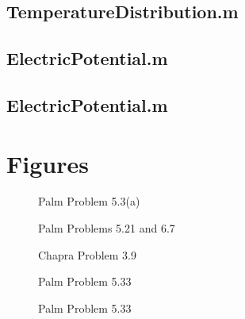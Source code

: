 \documentclass{article}
\begin{document}
\subsection{TemperatureDistribution.m}

\subsection{ElectricPotential.m}

\subsection{ElectricPotential.m}

\pagebreak


\section{Figures}

\begin{figure}[htb!]
\begin{center}
\caption{Palm Problem 5.3(a)}
\end{center}
\end{figure}

\begin{figure}[htb!]
\begin{center}
\caption{Palm Problems 5.21 and 6.7}
\end{center}
\end{figure}

\begin{figure}[htb!]
\begin{center}
\caption{Chapra Problem 3.9}
\end{center}
\end{figure}


\begin{figure}[htb!]
\begin{center}
\caption{Palm Problem 5.33}
\end{center}
\end{figure}

\begin{figure}[htb!]
\begin{center}
\caption{Palm Problem 5.33}
\end{center}
\end{figure}
\end{document}
